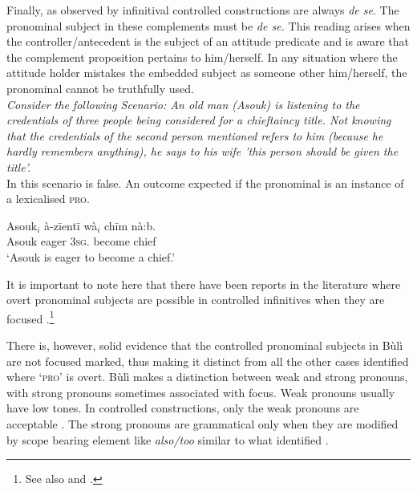 \documentclass[output=paper,colorlinks,citecolor=brown]{langscibook}
\begin{document}
Finally, as observed by \citet{Chierchia1989} infinitival controlled constructions are always {\it{de se}}. The pronominal subject in these complements must be {\it{de se.}} This reading arises when the controller/antecedent is the subject of an attitude predicate and is aware that the complement proposition pertains to him/herself. In any situation where the attitude holder mistakes the embedded subject as someone other him/herself, the pronominal cannot be truthfully used.\\

{\it{Consider the following Scenario: An old man (Asouk) is listening to the credentials of three people being considered for a chieftaincy title. Not knowing that the credentials of the second person mentioned refers to him (because he hardly remembers anything), he says to his wife 'this person should be given the title'.}}\\

In this scenario  is false. An outcome expected if the pronominal is an instance of a lexicalised \textsc{pro}. 

\ea%
    \label{ex:sulemana:23}
    \gll    Asouk$_i$ à-zīentī wà$_i$ chīm nà:b.  \\
            Asouk eager \textsc{3sg}. become chief \\
    \glt    `Asouk is eager to become a chief.'
\z

It is important to note here that there have been reports in the literature where overt pronominal subjects are possible in controlled infinitives when they are focused \citep{Szabolcsi2009}.\footnote{See also \citet{Barbosa2009} and  \citet{Madigan2008}.}


There is, however, solid evidence that the controlled pronominal subjects in Bùlì are not focused marked, thus making it distinct from all the other cases identified where `\textsc{pro}' is overt. Bùlì makes a distinction between weak and strong pronouns, with strong pronouns sometimes associated with focus. Weak pronouns usually have low tones. In controlled constructions, only the weak pronouns are acceptable . The strong pronouns are grammatical only when they are modified by scope bearing element like {\it{also/too}} similar to what \citet{Szabolcsi2009}  identified .
\end{document}
